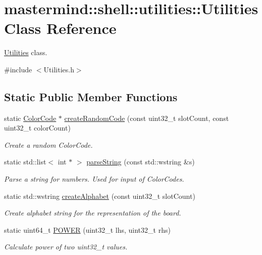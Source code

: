 \hypertarget{classmastermind_1_1shell_1_1utilities_1_1_utilities}{}\section{mastermind\+:\+:shell\+:\+:utilities\+:\+:Utilities Class Reference}
\label{classmastermind_1_1shell_1_1utilities_1_1_utilities}


\hyperlink{classmastermind_1_1shell_1_1utilities_1_1_utilities}{Utilities} class.  




{\ttfamily \#include $<$Utilities.\+h$>$}

\subsection*{Static Public Member Functions}
\begin{DoxyCompactItemize}
\item 
static \hyperlink{classmastermind_1_1logic_1_1_color_code}{Color\+Code} $\ast$ \hyperlink{classmastermind_1_1shell_1_1utilities_1_1_utilities_a023c76d90d0588949e26358c3f273219}{create\+Random\+Code} (const uint32\+\_\+t slot\+Count, const uint32\+\_\+t color\+Count)
\begin{DoxyCompactList}\small\item\em Create a random Color\+Code. \end{DoxyCompactList}\item 
static std\+::list$<$ int $\ast$ $>$ \hyperlink{classmastermind_1_1shell_1_1utilities_1_1_utilities_ab364b032c0a68c7a0dbd5696b23d23b0}{parse\+String} (const std\+::wstring \&s)
\begin{DoxyCompactList}\small\item\em Parse a string for numbers. Used for input of Color\+Codes. \end{DoxyCompactList}\item 
static std\+::wstring \hyperlink{classmastermind_1_1shell_1_1utilities_1_1_utilities_a29b0701b6eeea2cc5557da28def33d3e}{create\+Alphabet} (const uint32\+\_\+t slot\+Count)
\begin{DoxyCompactList}\small\item\em Create alphabet string for the representation of the board. \end{DoxyCompactList}\item 
static uint64\+\_\+t \hyperlink{classmastermind_1_1shell_1_1utilities_1_1_utilities_a890a9c41f6a4a13419fb6a7e456bfc4f}{P\+O\+W\+ER} (uint32\+\_\+t lhs, uint32\+\_\+t rhs)
\begin{DoxyCompactList}\small\item\em Calculate power of two uint32\+\_\+t values. \end{DoxyCompactList}\end{DoxyCompactItemize}
